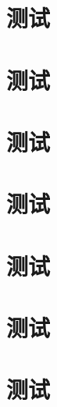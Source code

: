 \documentclass[library = {math.master}]{whuthesis}
\begin{document}
\section{测试}
\section{测试}
\section{测试}
\section{测试}


\section{测试}

\section{测试}
\zhlipsum[1-4]
\section{测试}
\zhlipsum[1-4]
\end{document}
